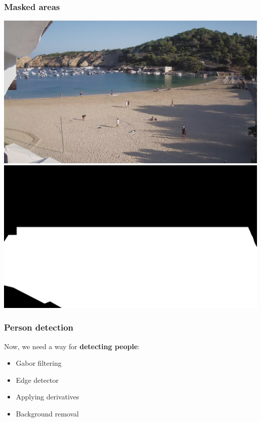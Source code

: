 \documentclass{beamer}
\begin{document}
\begin{frame}
    \frametitle{Masked areas}

    \centering

    \includegraphics[width=\textwidth,]{../Gelabert/1660287600.jpg}
    \vspace*{-6.25cm}
   { \includegraphics[width=\textwidth,]{../mask.png}}

\end{frame}



\begin{frame}
    \frametitle{Person detection}
    Now, we need a way for \textbf{detecting people}:
    \begin{itemize}
        \item<2-> Gabor filtering  
        \item<3-> Edge detector  
        \item<4-> Applying derivatives 
        \item<5-> Background removal  {\color{green} \checkmark}
    \end{itemize}
     
\end{frame}
\end{document}
